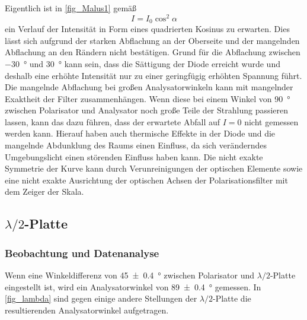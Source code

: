 \documentclass[
	a4paper,
	12pt,
	pagesize,
	ngerman
]{scrartcl}
\begin{document}
	Eigentlich ist in \cref{fig_Malus1} gemäß
	\begin{equation}
		I = I_0 \cos^2 \alpha
		\label{eq_malus}
	\end{equation}
	ein Verlauf der Intensität in Form eines quadrierten Kosinus zu erwarten.
	Dies lässt sich aufgrund der starken Abflachung an der Oberseite und der mangelnden Abflachung an den Rändern nicht bestätigen.
	Grund für die Abflachung zwischen \SI{-30}{\degree} und \SI{30}{\degree} kann sein, dass die Sättigung der Diode erreicht wurde und deshalb eine erhöhte Intensität nur zu einer geringfügig erhöhten Spannung führt.
	Die mangelnde Abflachung bei großen Analysatorwinkeln kann mit mangelnder Exaktheit der Filter zusammenhängen.
	Wenn diese bei einem Winkel von \SI{90}{\degree} zwischen Polarisator und Analysator noch große Teile der Strahlung passieren lassen, kann das dazu führen, dass der erwartete Abfall auf $I = 0$ nicht gemessen werden kann.
	Hierauf haben auch thermische Effekte in der Diode und die mangelnde Abdunklung des Raums einen Einfluss, da sich veränderndes Umgebungslicht einen störenden Einfluss haben kann.
	Die nicht exakte Symmetrie der Kurve kann durch Verunreinigungen der optischen Elemente sowie eine nicht exakte Ausrichtung der optischen Achsen der Polarisationsfilter mit dem Zeiger der Skala.
	
	\subsection{$\lambda/2$-Platte}
	\subsubsection{Beobachtung und Datenanalyse}
	Wenn eine Winkeldifferenz von \SI{45+-0,4}{\degree} zwischen Polarisator und $\lambda/2$-Platte eingestellt ist, wird ein Analysatorwinkel von \SI{89+-0,4}{\degree} gemessen.
	In \cref{fig_lambda} sind gegen einige andere Stellungen der $\lambda/2$-Platte die resultierenden Analysatorwinkel aufgetragen.
\end{document}
